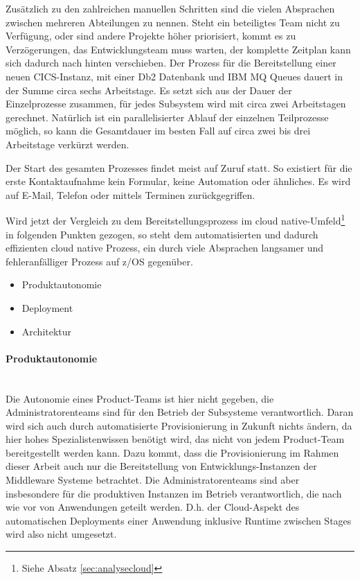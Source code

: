 Zusätzlich zu den zahlreichen manuellen Schritten sind die vielen Absprachen zwischen mehreren Abteilungen zu nennen.
Steht ein beteiligtes Team nicht zu Verfügung, oder sind andere Projekte höher priorisiert, kommt es zu Verzögerungen, das Entwicklungsteam muss warten, der komplette Zeitplan kann sich dadurch nach hinten verschieben.
Der Prozess für die Bereitstellung einer neuen CICS-Instanz, mit einer Db2 Datenbank und IBM MQ Queues dauert in der Summe circa sechs Arbeitstage.
Es setzt sich aus der Dauer der Einzelprozesse zusammen, für jedes Subsystem wird mit circa zwei Arbeitstagen gerechnet.
Natürlich ist ein parallelisierter Ablauf der einzelnen Teilprozesse möglich, so kann die Gesamtdauer im besten Fall auf circa zwei bis drei Arbeitstage verkürzt werden. 

Der Start des gesamten Prozesses findet meist auf \glqq Zuruf\grqq{} statt.
So existiert für die erste Kontaktaufnahme kein Formular, keine Automation oder ähnliches.
Es wird auf E-Mail, Telefon oder mittels Terminen zurückgegriffen.

Wird jetzt der Vergleich zu dem Bereitstellungsprozess im cloud native-Umfeld\footnote{Siehe Absatz \ref{sec:analysecloud}} in folgenden Punkten gezogen, so steht dem automatisierten und dadurch effizienten cloud native Prozess, ein durch viele Absprachen langsamer und fehleranfälliger Prozess auf z/OS gegenüber.

\begin{itemize}
\item Produktautonomie
\item Deployment
\item Architektur
\end{itemize}

\paragraph{Produktautonomie}~\\
Die Autonomie eines Product-Teams ist hier nicht gegeben, die Administratorenteams sind für den Betrieb der Subsysteme verantwortlich.
Daran wird sich auch durch automatisierte Provisionierung in Zukunft nichts ändern, da hier hohes Spezialistenwissen benötigt wird, das nicht von jedem Product-Team bereitgestellt werden kann. 
Dazu kommt, dass die Provisionierung im Rahmen dieser Arbeit auch nur die Bereitstellung von Entwicklungs-Instanzen der Middleware Systeme betrachtet. 
Die Administratorenteams sind aber insbesondere für die produktiven Instanzen im Betrieb verantwortlich, die nach wie vor von Anwendungen geteilt werden.  
D.h. der Cloud-Aspekt des automatischen Deployments einer Anwendung inklusive Runtime zwischen Stages wird also nicht umgesetzt.

